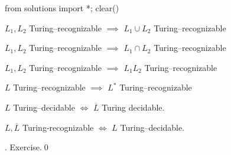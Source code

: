 \begin{python0}
from solutions import *; clear()
\end{python0}

\begin{thm}
\begin{tightlist}
\item $L_1, L_2$ Turing--recognizable $\implies$
      $L_1 \cup L_2$ Turing--recognizable
\item $L_1, L_2$ Turing--recognizable $\implies$
      $L_1 \cap L_2$ Turing--recognizable
\item $L_1, L_2$ Turing--recognizable $\implies$
      $L_1 L_2$ Turing--recognizable
\item $L$ Turing--recognizable $\implies$
      $L^*$ Turing--recognizable
\item $L$ Turing--decidable $\iff$
      $\overline L$ Turing decidable. 
\item $L, \overline L$ Turing-recognizable
      $\iff$
      $L$ Turing--decidable.
\end{tightlist}
\end{thm}


\proof. Exercise.\qed
